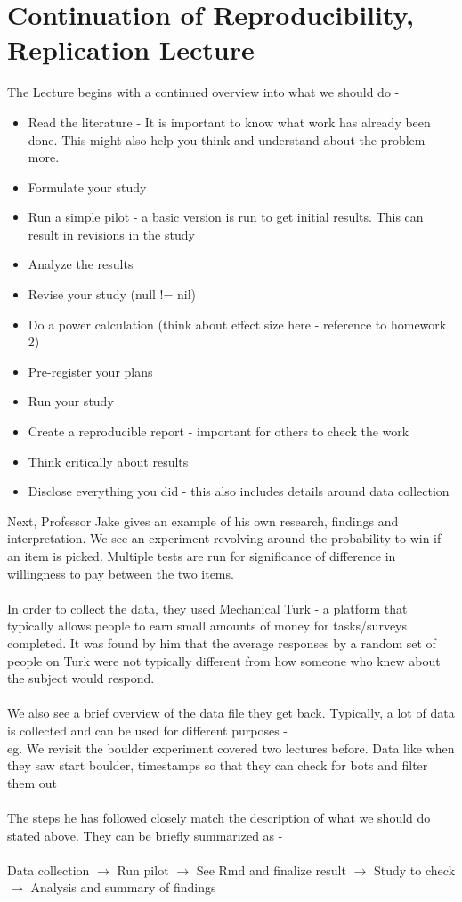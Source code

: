 
\section{Continuation of Reproducibility, Replication Lecture}

The Lecture begins with a continued overview into what we should do - 
\begin{itemize}
  \item Read the literature - It is important to know what work has already been done. This might also help you think and understand about the problem more.
  \item Formulate your study
  \item Run a simple pilot - a basic version is run to get initial results. This can result in revisions in the study
  \item Analyze the results
  \item Revise your study (null != nil)
  \item Do a power calculation (think about effect size here - reference to homework 2)
  \item Pre-register your plans
  \item Run your study
  \item Create a reproducible report - important for others to check the work
  \item Think critically about results
  \item Disclose everything you did - this also includes details around data collection
\end{itemize}
\bigskip
Next, Professor Jake gives an example of his own research, findings and interpretation. We see an experiment revolving around the probability to win if an item is picked. Multiple tests are run for significance of difference in willingness to pay between the two items.
\\
\\
In order to collect the data, they used Mechanical Turk - a platform that typically allows people to earn small amounts of money for tasks/surveys completed. It was found by him that the average responses by a random set of people on Turk were not typically different from how someone who knew about the subject would respond.
\\
\\
We also see a brief overview of the data file they get back. Typically, a lot of data is collected and can be used for different purposes -
\\
eg. We revisit the boulder experiment covered two lectures before. Data like when they saw start boulder, timestamps so that they can check for bots and filter them out
\\
\\
The steps he has followed closely match the description of what we should do stated above. They can be briefly summarized as -
\\
\\
Data collection $\rightarrow$ Run pilot $\rightarrow$ See Rmd and finalize result  $\rightarrow$ Study to check $\rightarrow$ Analysis and summary of findings

